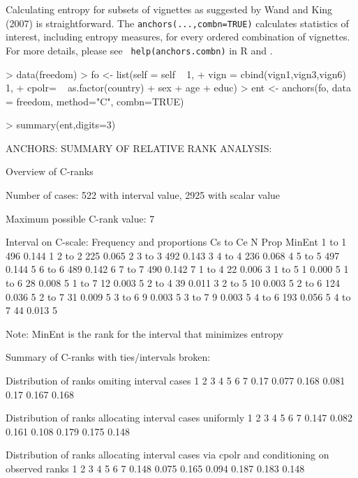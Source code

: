 \documentclass{amsart}
\newcommand{\code}[1]{{\texttt{#1}}}
\begin{document}
Calculating entropy for subsets of vignettes as suggested by Wand and
King (2007) is straightforward.  The \code{anchors(...,combn=TRUE)}
calculates statistics of interest, including entropy measures, for
every ordered combination of vignettes.  For more details, please see {\tt
help(anchors.combn)} in R and \cite{king.wand:2007}.
\begin{Schunk}
\begin{Sinput}
> data(freedom)
> fo <- list(self = self ~ 1,
+            vign = cbind(vign1,vign3,vign6) ~ 1, 
+            cpolr= ~ as.factor(country) + sex + age + educ)
> ent <- anchors(fo, data = freedom, method="C", combn=TRUE)
\end{Sinput}
\end{Schunk}
\begin{Schunk}
\begin{Sinput}
> summary(ent,digits=3)
\end{Sinput}
\begin{Soutput}
ANCHORS: SUMMARY OF RELATIVE RANK ANALYSIS:

Overview of C-ranks

Number of cases: 522 with interval value, 2925 with scalar value

Maximum possible C-rank value: 7

Interval on C-scale: Frequency and proportions Cs to Ce
           N  Prop MinEnt
 1 to  1 496 0.144      1
 2 to  2 225 0.065      2
 3 to  3 492 0.143      3
 4 to  4 236 0.068      4
 5 to  5 497 0.144      5
 6 to  6 489 0.142      6
 7 to  7 490 0.142      7
 1 to  4  22 0.006      3
 1 to  5   1 0.000      5
 1 to  6  28 0.008      5
 1 to  7  12 0.003      5
 2 to  4  39 0.011      3
 2 to  5  10 0.003      5
 2 to  6 124 0.036      5
 2 to  7  31 0.009      5
 3 to  6   9 0.003      5
 3 to  7   9 0.003      5
 4 to  6 193 0.056      5
 4 to  7  44 0.013      5

Note: MinEnt is the rank for the interval that minimizes entropy

Summary of C-ranks with ties/intervals broken:

Distribution of ranks omiting interval cases
    1     2     3     4    5     6     7
 0.17 0.077 0.168 0.081 0.17 0.167 0.168

Distribution of ranks allocating interval cases uniformly
     1     2     3     4     5     6     7
 0.147 0.082 0.161 0.108 0.179 0.175 0.148

Distribution of ranks allocating interval cases via cpolr
and conditioning on observed ranks
    1     2     3     4     5     6     7 
0.148 0.075 0.165 0.094 0.187 0.183 0.148 


\end{Soutput}
\end{Schunk}
\end{document}
